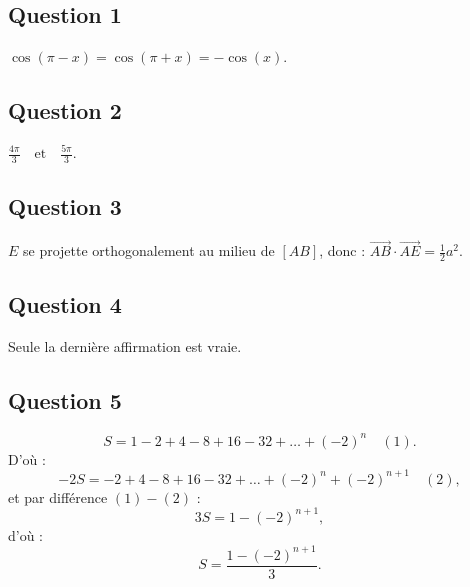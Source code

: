 \subsection*{Question 1}

\(\cos(\pi - x) = \cos(\pi + x) = - \cos(x)\).

\subsection*{Question 2}

\(\frac{4\pi}{3} \quad \text{et} \quad \frac{5\pi}{3}\).

\subsection*{Question 3}

\( E \) se projette orthogonalement au milieu de \([AB]\), donc : \(\overrightarrow{AB} \cdot \overrightarrow{AE} = \frac{1}{2} a^2\).

\subsection*{Question 4}

Seule la dernière affirmation est vraie.

\subsection*{Question 5}

\[
S = 1 - 2 + 4 - 8 + 16 - 32 + \dots + (-2)^n \quad (1).
\]
D'où :
\[
-2S = -2 + 4 - 8 + 16 - 32 + \dots + (-2)^n + (-2)^{n+1} \quad (2),
\]
et par différence \( (1) - (2) \) :
\[
3S = 1 - (-2)^{n+1},
\]
d'où :
\[
S = \frac{1 - (-2)^{n+1}}{3}.
\]
